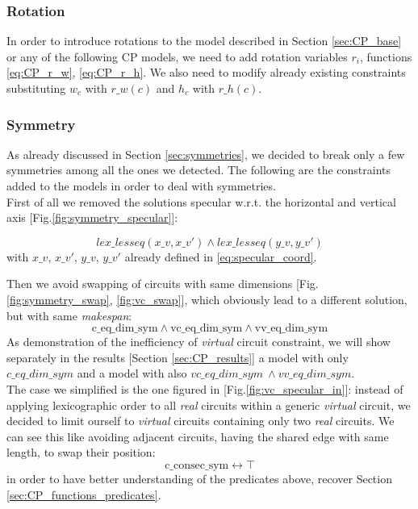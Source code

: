 \subsubsection{Rotation} \label{sec:CP_rotation}

In order to introduce rotations to the model described in Section \ref{sec:CP_base} or any
of the following CP models, we need to add rotation variables $r_i$, functions \ref{eq:CP_r_w}, \ref{eq:CP_r_h}. We
also need to modify already existing constraints substituting $w_c$ with $r\_w(c)$ and $h_c$ with $r\_h(c)$.

\subsubsection{Symmetry} \label{sec:CP_symmetry}

As already discussed in Section \ref{sec:symmetries}, we decided to break only a few symmetries among all the ones we
detected. The following are the constraints added to the models in order to deal with symmetries.\\

First of all we removed the solutions specular w.r.t. the horizontal and vertical axis [Fig.\ref{fig:symmetry_specular}]:

\begin{equation*}
  lex\_lesseq(x\_v, x\_v') \land lex\_lesseq(y\_v, y\_v')
\end{equation*}
with $x\_v$, $x\_v'$, $y\_v$, $y\_v'$ already defined in \ref{eq:specular_coord}.

Then we avoid swapping of circuits with same dimensions [Fig.\ref{fig:symmetry_swap}, \ref{fig:vc_swap}],
which obviously lead to a different solution, but with same \textit{makespan}:
\begin{equation*}
  \text{c\_eq\_dim\_sym} \land \text{vc\_eq\_dim\_sym} \land \text{vv\_eq\_dim\_sym}
\end{equation*}
As demonstration of the inefficiency of \textit{virtual} circuit constraint, we will show 
separately in the results [Section \ref{sec:CP_results}] a model with only \(c\_eq\_dim\_sym\)
and a model with also \(vc\_eq\_dim\_sym\ \land vv\_eq\_dim\_sym\).\\

The case we simplified is the one figured in [Fig.\ref{fig:vc_specular_in}]: instead of applying
lexicographic order to all \textit{real} circuits within a generic \textit{virtual} circuit, we
decided to limit ourself to \textit{virtual} circuits containing only two \textit{real} circuits.
We can see this like avoiding adjacent circuits, having the shared edge with same length,
to swap their position:
\begin{equation*}
  \text{c\_consec\_sym} \leftrightarrow \top
\end{equation*}
in order to have better understanding of the predicates above, recover Section \ref{sec:CP_functions_predicates}.

